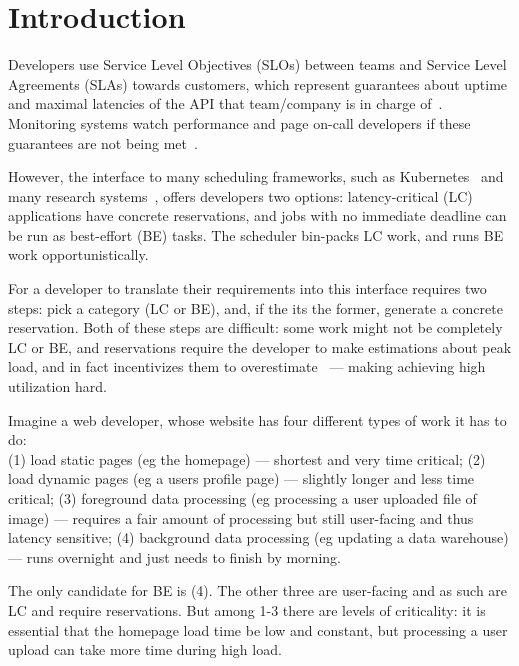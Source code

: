 \section{Introduction}

Developers use Service Level Objectives (SLOs) between teams and Service Level
Agreements (SLAs) towards customers, which represent guarantees about uptime and
maximal latencies of the API that team/company is in charge of~\cite{awssla}.
Monitoring systems watch performance and page on-call developers if these
guarantees are not being met~\cite{cloudwatch}.

However, the interface to many scheduling frameworks, such as
Kubernetes~\cite{kubernetes} and many research systems~\cite{caladan}, offers
developers two options: latency-critical (LC) applications have concrete
reservations, and jobs with no immediate deadline can be run as best-effort (BE)
tasks. The scheduler bin-packs LC work, and runs BE work opportunistically.


For a developer to translate their requirements into this interface requires two
steps: pick a category (LC or BE), and, if the its the former, generate a
concrete reservation. Both of these steps are difficult: some work might not be
completely LC or BE, and reservations require the developer to make estimations
about peak load, and in fact incentivizes them to
overestimate~\cite*{overprovision} --- making achieving high utilization hard.

Imagine a web developer, whose website has four different types of work it has
to do: \\
(1) load static pages (eg the homepage) --- shortest and very time critical; 
(2) load dynamic pages (eg a users profile page) --- slightly longer and less
time critical;
(3) foreground data processing (eg processing a user uploaded file of image) ---
requires a fair amount of processing but still user-facing and thus latency
sensitive;
(4) background data processing (eg updating a data warehouse) --- runs overnight
and just needs to finish by morning.

The only candidate for BE is (4). The other three are user-facing and as such
are LC and require reservations. But among 1-3 there are levels of
criticality: it is essential that the homepage load time be low and constant,
but processing a user upload can take more time during high load.

